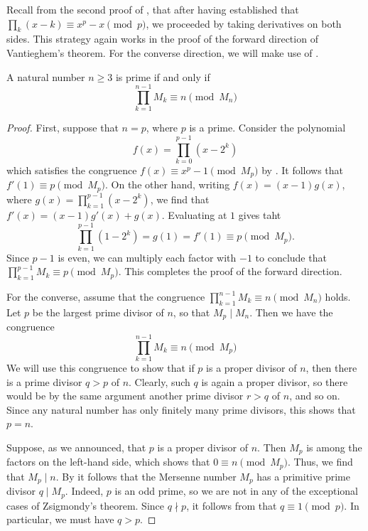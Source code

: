 Recall from the second proof of , that after having established that $\prod_k(x-k)\equiv x^p-x\pmod{p}$, we proceeded by taking derivatives on both sides. This strategy again works in the proof of the forward direction of Vantieghem's theorem. For the converse direction, we will make use of .

\begin{theorem}\label{theorem:vantieghem}
  A natural number $n\geq 3$ is prime if and only if
  \begin{equation*}
    \prod_{k=1}^{n-1}M_k \equiv n\pmod{M_n}
  \end{equation*}
\end{theorem}

\begin{proof}
  First, suppose that $n=p$, where $p$ is a prime. Consider the polynomial
  \begin{equation*}
    f(x)=\prod_{k=0}^{p-1}(x-2^k)
  \end{equation*}
  which satisfies the congruence $f(x)\equiv x^p-1\pmod{M_p}$ by . It follows that $f'(1)\equiv p\pmod{M_p}$. On the other hand, writing $f(x)=(x-1)g(x)$, where $g(x)=\prod_{k=1}^{p-1}(x-2^k)$, we find that $f'(x)=(x-1)g'(x)+g(x)$. Evaluating at $1$ gives taht
  \begin{equation*}
    \prod_{k=1}^{p-1}(1-2^k)=g(1)=f'(1)\equiv p\pmod{M_p}.
  \end{equation*}
  Since $p-1$ is even, we can multiply each factor with $-1$ to conclude that $\prod_{k=1}^{p-1}M_k\equiv p\pmod{M_p}$. This completes the proof of the forward direction.

  For the converse, assume that the congruence $\prod_{k=1}^{n-1}M_k \equiv n\pmod{M_n}$ holds. Let $p$ be the largest prime divisor of $n$, so that $M_p\mid M_n$. Then we have the congruence
  \begin{equation*}
    \prod_{k=1}^{n-1}M_k \equiv n\pmod{M_p}
  \end{equation*}
  We will use this congruence to show that if $p$ is a proper divisor of $n$, then there is a prime divisor $q>p$ of $n$. Clearly, such $q$ is again a proper divisor, so there would be by the same argument another prime divisor $r>q$ of $n$, and so on. Since any natural number has only finitely many prime divisors, this shows that $p=n$.
  
  Suppose, as we announced, that $p$ is a proper divisor of $n$. Then $M_p$ is among the factors on the left-hand side, which shows that $0\equiv n\pmod{M_p}$. Thus, we find that $M_p\mid n$. By  it follows that the Mersenne number $M_p$ has a primitive prime divisor $q\mid M_p$. Indeed, $p$ is an odd prime, so we are not in any of the exceptional cases of Zsigmondy's theorem. Since $q\nmid p$, it follows from  that $q\equiv 1\pmod{p}$. In particular, we must have $q>p$.
\end{proof}

